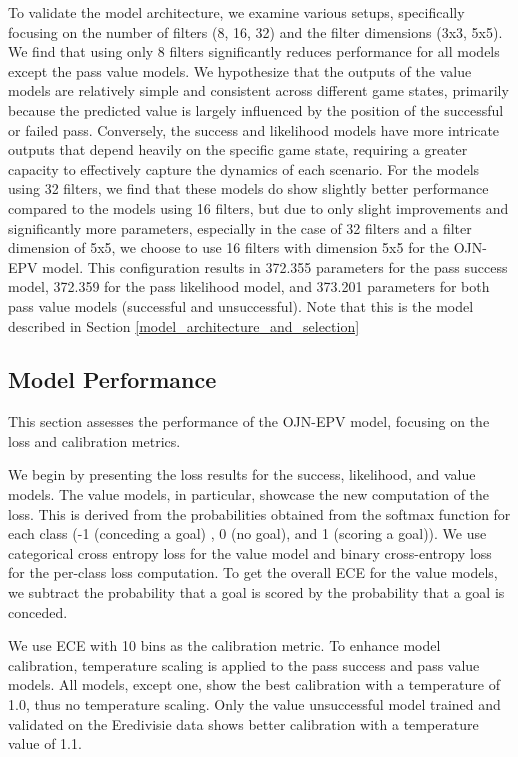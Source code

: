 To validate the model architecture, we examine various setups, specifically focusing on the number of filters (8, 16, 32) and the filter dimensions (3x3, 5x5). We find that using only 8 filters significantly reduces performance for all models except the pass value models. We hypothesize that the outputs of the value models are relatively simple and consistent across different game states, primarily because the predicted value is largely influenced by the position of the successful or failed pass. Conversely, the success and likelihood models have more intricate outputs that depend heavily on the specific game state, requiring a greater capacity to effectively capture the dynamics of each scenario. For the models using 32 filters, we find that these models do show slightly better performance compared to the models using 16 filters, but due to only slight improvements and significantly more parameters, especially in the case of 32 filters and a filter dimension of 5x5, we choose to use 16 filters with dimension 5x5 for the OJN-EPV model. This configuration results in 372.355 parameters for the pass success model, 372.359 for the pass likelihood model, and 373.201 parameters for both pass value models (successful and unsuccessful). Note that this is the model described in Section \ref{model_architecture_and_selection}

\subsection{Model Performance}
This section assesses the performance of the OJN-EPV model, focusing on the loss and calibration metrics.

We begin by presenting the loss results for the success, likelihood, and value models. The value models, in particular, showcase the new computation of the loss. This is derived from the probabilities obtained from the softmax function for each class (-1 (conceding a goal) , 0 (no goal), and 1 (scoring a goal)). We use categorical cross entropy loss for the value model and binary cross-entropy loss for the per-class loss computation. To get the overall ECE for the value models, we subtract the probability that a goal is scored by the probability that a goal is conceded.

We use ECE with 10 bins as the calibration metric. To enhance model calibration, temperature scaling is applied to the pass success and pass value models. All models, except one, show the best calibration with a temperature of 1.0, thus no temperature scaling. Only the value unsuccessful model trained and validated on the Eredivisie data shows better calibration with a temperature value of 1.1.

